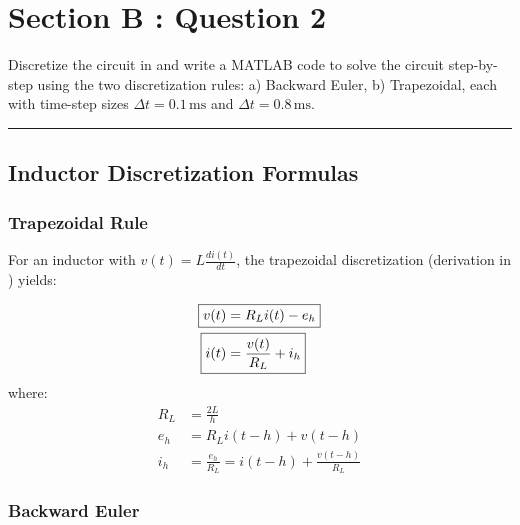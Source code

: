 \clearpage
\renewcommand{\sectionprefix}{B.2}  %
\setcounter{subsection}{0}  %
\section*{Section B : Question 2}
\renewcommand{\subsectionmark}[1]{}

Discretize the circuit in  and write a MATLAB code to solve the circuit step-by-step using the two discretization rules: a) Backward Euler, b) Trapezoidal, each with time-step sizes $\Delta t = 0.1\,\text{ms}$ and $\Delta t = 0.8\,\text{ms}$.

\noindent\rule{\textwidth}{0.4pt}

\subsection{Inductor Discretization Formulas}


\subsubsection*{Trapezoidal Rule}

For an inductor with $v(t) = L \frac{di(t)}{dt}$, the trapezoidal discretization (derivation in ) yields:

\begin{tcolorbox}[colback=burntOrange!5, colframe=burntOrange!80!black, title={\color{white}\textbf{Trapezoidal: Inductor Companion Model}}]
\begin{align}
    \Aboxed{v(t) &= R_L i(t) - e_h} \label{eq:vt_ind_trapz} \\
    \Aboxed{i(t) &= \frac{v(t)}{R_L} + i_h} \label{eq:it_ind_trapz}
\end{align}
where:
\begin{align}
    R_L &= \frac{2L}{h} \\
    e_h &= R_L i(t-h) + v(t-h) \\
    i_h &= \frac{e_h}{R_L} = i(t-h) + \frac{v(t-h)}{R_L}
\end{align}
\end{tcolorbox}

\subsubsection*{Backward Euler}

